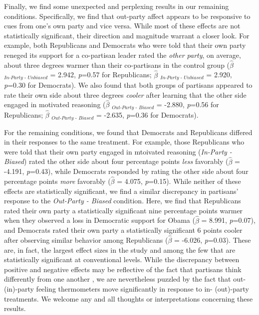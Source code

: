 \documentclass[12pt, letterpaper]{article}
\begin{document}
Finally, we find some unexpected and perplexing results in our remaining conditions. Specifically, we find that out-party affect appears to be responsive to cues from one's own party and vice versa. While most of these effects are not statistically significant, their direction and magnitude warrant a closer look. For example, both Republicans and Democrats who were told that their own party reneged its support for a co-partisan leader rated the \textit{other party}, on average, about three degrees warmer than their co-partisans in the control group ($\hat{\beta}$ $_{\textit{In-Party - Unbiased}}$ = 2.942, \textit{p}=0.57 for Republicans; $\hat{\beta}$ $_{\textit{In-Party - Unbiased}}$ = 2.920, \textit{p}=0.30 for Democrats). We also found that both groups of partisans appeared to rate their own side about three degrees \textit{cooler} after learning that the other side engaged in motivated reasoning ($\hat{\beta}$ $_{\textit{Out-Party - Biased}}$ = -2.880, \textit{p}=0.56 for Republicans; $\hat{\beta}$ $_{\textit{Out-Party - Biased}}$ = -2.635, \textit{p}=0.36 for Democrats). 

For the remaining conditions, we found that Democrats and Republicans differed in their responses to the same treatment. For example, those Republicans who were told that their own party engaged in mtoivated reasoning  (\textit{In-Party - Biased}) rated the other side about four percentage points \textit{less} favorably ($\hat{\beta}$ = -4.191, \textit{p}=0.43), while Democrats responded by rating the other side about four percentage points \textit{more} favorably ($\hat{\beta}$ = 4.075, \textit{p}=0.15). While neither of these effects are statistically significant, we find a similar discrepancy in partisans' response to the \textit{Out-Party - Biased} condition. Here, we find that Republicans rated their own party a statistically significant nine percentage points warmer when they observed a loss in Democratic support for Obama ($\hat{\beta}$ = 8.991, \textit{p}=0.07), and Democrats rated their own party a statistically significant 6 points cooler after observing similar behavior among Republicans ($\hat{\beta}$ = -6.026, \textit{p}=0.03). These are, in fact, the largest effect sizes in the study and among the few that are statistically significant at conventional levels. While the discrepancy between positive and negative effects may be reflective of the fact that partisans think differently from one another \citep{grossmanhopkins_2016}, we are nevertheless puzzled by the fact that out- (in)-party feeling thermometers move significantly in response to in- (out)-party treatments. We welcome any and all thoughts or interpretations concerning these results. 
\end{document}

